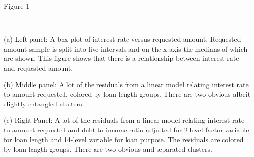 \documentclass[a4paper,12pt]{extarticle}
\begin{document}
Figure 1

\

(a) Left panel: A box plot of interest rate versus requested amount. Requested amount sample is split into five intervals and on the x-axis the medians of which are shown. This figure shows that there is a relationship between interest rate and requested amount.

(b) Middle panel: A lot of the residuals from a linear model relating interest rate to amount requested, colored by loan length groups. There are two obvious albeit slightly entangled clusters.

(c) Right Panel: A lot of the residuals from a linear model relating interest rate to amount requested and debt-to-income ratio adjusted for 2-level factor variable for loan length and 14-level variable for loan purpose. The residuals are colored by loan length groups. There are two obvious and separated clusters.
\end{document}
